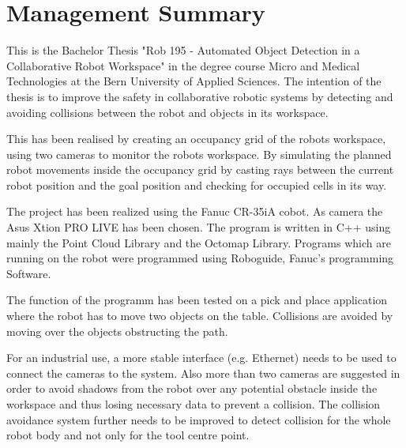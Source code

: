 \chapter*{Management Summary}
\label{chap:managementSummary}

This is the Bachelor Thesis "Rob 195 - Automated Object Detection in a Collaborative Robot Workspace" in the degree course Micro and Medical Technologies at the Bern University of Applied Sciences. The intention of the thesis is to improve the safety in collaborative robotic systems by detecting and avoiding collisions between the robot
and objects in its workspace. 

This has been realised by creating an occupancy grid of the robots workspace, using two cameras to monitor the robots workspace. By simulating the planned robot movements inside the occupancy grid by casting rays between the current robot position and the goal position and checking for occupied cells in its way.

The project has been realized using the Fanuc CR-35iA cobot. As camera the Asus Xtion PRO LIVE has been chosen. The program is written in C++ using mainly the Point Cloud Library and the Octomap Library. Programs which are running on the robot were programmed using Roboguide, Fanuc's programming Software. 

The function of the programm has been tested on a pick and place application where the robot has to move two objects on the table. Collisions are avoided by moving over the objects obstructing the path.

For an industrial use, a more stable interface (e.g. Ethernet) needs to be used to connect the cameras to the system. Also more than two cameras are suggested in order to avoid shadows from the robot over any potential obstacle inside the workspace and thus losing necessary data to prevent a collision. The collision avoidance system further needs to be improved to detect collision for the whole robot body and not only for the tool centre point.
